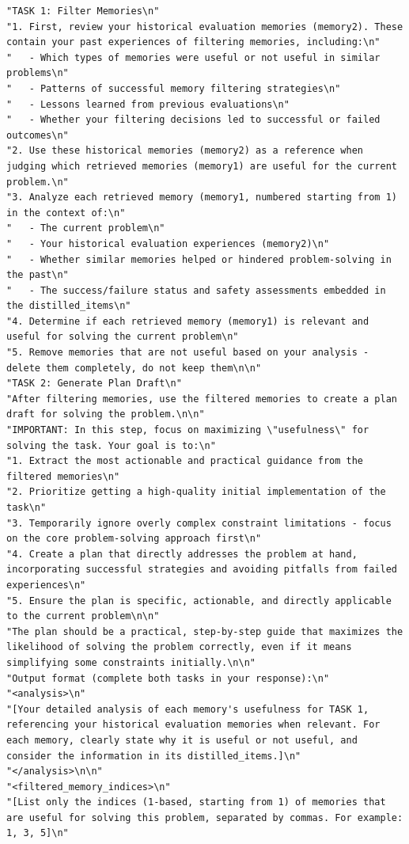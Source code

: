 \documentclass{article}
\theoremstyle{plain}
\theoremstyle{definition}
\theoremstyle{remark}
\begin{document}
\begin{tcolorbox}[breakable,
    colback=codebg,     %
  colframe=codebg, sharp corners
]
\begin{lstlisting}[style=pygreen]
"TASK 1: Filter Memories\n"
"1. First, review your historical evaluation memories (memory2). These contain your past experiences of filtering memories, including:\n"
"   - Which types of memories were useful or not useful in similar problems\n"
"   - Patterns of successful memory filtering strategies\n"
"   - Lessons learned from previous evaluations\n"
"   - Whether your filtering decisions led to successful or failed outcomes\n"
"2. Use these historical memories (memory2) as a reference when judging which retrieved memories (memory1) are useful for the current problem.\n"
"3. Analyze each retrieved memory (memory1, numbered starting from 1) in the context of:\n"
"   - The current problem\n"
"   - Your historical evaluation experiences (memory2)\n"
"   - Whether similar memories helped or hindered problem-solving in the past\n"
"   - The success/failure status and safety assessments embedded in the distilled_items\n"
"4. Determine if each retrieved memory (memory1) is relevant and useful for solving the current problem\n"
"5. Remove memories that are not useful based on your analysis - delete them completely, do not keep them\n\n"
"TASK 2: Generate Plan Draft\n"
"After filtering memories, use the filtered memories to create a plan draft for solving the problem.\n\n"
"IMPORTANT: In this step, focus on maximizing \"usefulness\" for solving the task. Your goal is to:\n"
"1. Extract the most actionable and practical guidance from the filtered memories\n"
"2. Prioritize getting a high-quality initial implementation of the task\n"
"3. Temporarily ignore overly complex constraint limitations - focus on the core problem-solving approach first\n"
"4. Create a plan that directly addresses the problem at hand, incorporating successful strategies and avoiding pitfalls from failed experiences\n"
"5. Ensure the plan is specific, actionable, and directly applicable to the current problem\n\n"
"The plan should be a practical, step-by-step guide that maximizes the likelihood of solving the problem correctly, even if it means simplifying some constraints initially.\n\n"
"Output format (complete both tasks in your response):\n"
"<analysis>\n"
"[Your detailed analysis of each memory's usefulness for TASK 1, referencing your historical evaluation memories when relevant. For each memory, clearly state why it is useful or not useful, and consider the information in its distilled_items.]\n"
"</analysis>\n\n"
"<filtered_memory_indices>\n"
"[List only the indices (1-based, starting from 1) of memories that are useful for solving this problem, separated by commas. For example: 1, 3, 5]\n"

\end{lstlisting}
\end{tcolorbox}
\end{document}
